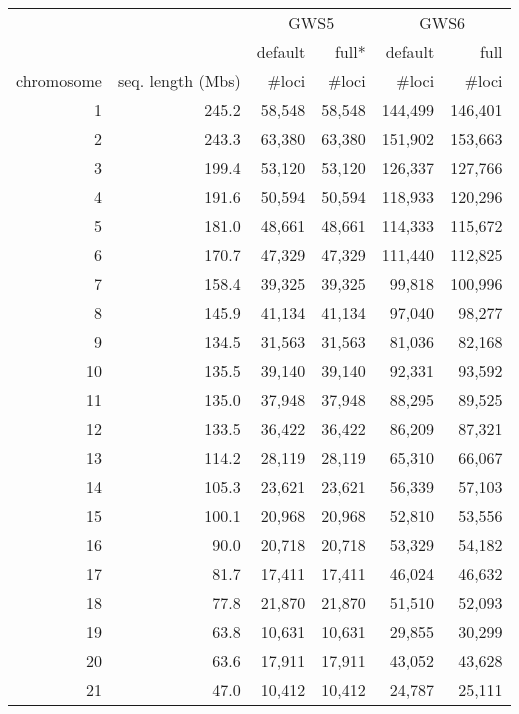 \documentclass[10pt,a4paper]{article}
\newcommand{\GWSFive}{GWS5\xspace}
\newcommand{\GWSSix}{GWS6\xspace}
\begin{document}
\begin{table}[hp]
\begin{center}
\begin{tabular}{|r|r||rr||rr|}
\hline
     & & \multicolumn{2}{c||}{\GWSFive} & \multicolumn{2}{c|}{\GWSSix} \\
     & & default & full* & default & full \\
chromosome & seq. length (Mbs) & \#loci & \#loci & \#loci & \#loci \\
\hline
\hline
1  & 245.2   & 58,548  &  58,548  &  144,499  &  146,401  \\
2  & 243.3   & 63,380  &  63,380  &  151,902  &  153,663  \\
3  & 199.4   & 53,120  &  53,120  &  126,337  &  127,766  \\
4  & 191.6   & 50,594  &  50,594  &  118,933  &  120,296  \\
5  & 181.0   & 48,661  &  48,661  &  114,333  &  115,672  \\
6  & 170.7   & 47,329  &  47,329  &  111,440  &  112,825  \\
7  & 158.4   & 39,325  &  39,325  &   99,818  &  100,996  \\
8  & 145.9   & 41,134  &  41,134  &   97,040  &   98,277  \\
9  & 134.5   & 31,563  &  31,563  &   81,036  &   82,168  \\
10 & 135.5   & 39,140  &  39,140  &   92,331  &   93,592  \\
\hline
11 & 135.0   & 37,948  &  37,948  &   88,295  &   89,525  \\
12 & 133.5   & 36,422  &  36,422  &   86,209  &   87,321  \\
13 & 114.2   & 28,119  &  28,119  &   65,310  &   66,067  \\
14 & 105.3   & 23,621  &  23,621  &   56,339  &   57,103  \\
15 & 100.1   & 20,968  &  20,968  &   52,810  &   53,556  \\
16 &  90.0   & 20,718  &  20,718  &   53,329  &   54,182  \\
17 &  81.7   & 17,411  &  17,411  &   46,024  &   46,632  \\
18 &  77.8   & 21,870  &  21,870  &   51,510  &   52,093  \\
19 &  63.8   & 10,631  &  10,631  &   29,855  &   30,299  \\
20 &  63.6   & 17,911  &  17,911  &   43,052  &   43,628  \\
\hline
21 &  47.0   & 10,412  &  10,412  &   24,787  &   25,111  \\

\end{tabular}
\end{center}
\end{table}
\end{document}
